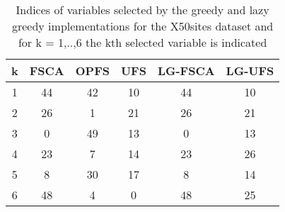 \begin{table}
	\begin{center}
		\begin{tabular}{c c c c c c}
			k & FSCA & OPFS & UFS & LG-FSCA & LG-UFS \\
			\hline
			1 & 44 & 42 & 10 & 44 & 10 \\
			2 & 26 & 1 & 21 & 26 & 21 \\
			3 & 0 & 49 & 13 & 0 & 13 \\
			4 & 23 & 7 & 14 & 23 & 26 \\
			5 & 8 & 30 & 17 & 8 & 14 \\
			6 & 48 & 4 & 0 & 48 & 25 \\
		\end{tabular}
	\end{center}
	\caption{Indices of variables selected by the greedy and lazy greedy implementations for the X50sites dataset and for k = 1,..,6 the kth selected variable is indicated}
\end{table}